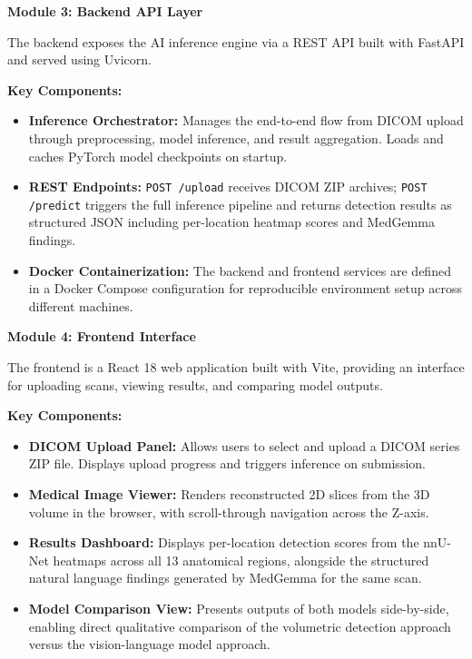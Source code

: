 \documentclass[twoside,a4paper,openright]{report} %
\begin{document}
\medskip\noindent
\textbf{Module 3: Backend API Layer}

\noindent The backend exposes the AI inference engine via a REST API built with FastAPI and served using Uvicorn.

\noindent\textbf{Key Components:}
\begin{itemize}
  \item \textbf{Inference Orchestrator:} Manages the end-to-end flow from DICOM upload through preprocessing, model inference, and result aggregation. Loads and caches PyTorch model checkpoints on startup.
  \item \textbf{REST Endpoints:} \texttt{POST /upload} receives DICOM ZIP archives; \texttt{POST /predict} triggers the full inference pipeline and returns detection results as structured JSON including per-location heatmap scores and MedGemma findings.
  \item \textbf{Docker Containerization:} The backend and frontend services are defined in a Docker Compose configuration for reproducible environment setup across different machines.
\end{itemize}


\medskip\noindent
\textbf{Module 4: Frontend Interface}

\noindent The frontend is a React 18 web application built with Vite, providing an interface for uploading scans, viewing results, and comparing model outputs.

\noindent\textbf{Key Components:}
\begin{itemize}
  \item \textbf{DICOM Upload Panel:} Allows users to select and upload a DICOM series ZIP file. Displays upload progress and triggers inference on submission.
  \item \textbf{Medical Image Viewer:} Renders reconstructed 2D slices from the 3D volume in the browser, with scroll-through navigation across the Z-axis.
  \item \textbf{Results Dashboard:} Displays per-location detection scores from the nnU-Net heatmaps across all 13 anatomical regions, alongside the structured natural language findings generated by MedGemma for the same scan.
  \item \textbf{Model Comparison View:} Presents outputs of both models side-by-side, enabling direct qualitative comparison of the volumetric detection approach versus the vision-language model approach.
\end{itemize}
\end{document}
